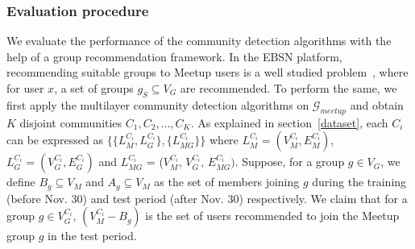 \subsubsection{Evaluation procedure}
We evaluate the performance of the community detection algorithms with the help of a group recommendation framework.
In the EBSN platform, recommending suitable groups to Meetup users is a well studied problem~\cite{group_reco2_TASP}, where for 
user $x$, a set of groups $g_S \subseteq V_G$
are recommended.
To perform the same, we first apply the multilayer community detection algorithms on $\mathcal{G}_{meetup}$ and obtain $K$ disjoint
communities $C_1, C_2,\dots,C_K$. As explained in section~\ref{dataset}, each $C_i$ can be expressed as
$\{\{L^{C_i}_M, L^{C_i}_G\},\{L^{C_i}_{MG}\}\}$ where $L^{C_i}_M = (V^{C_i}_M, E^{C_i}_M)$,
$L^{C_i}_G = (V^{C_i}_G, E^{C_i}_G)$ and $L^{C_i}_{MG}$ = ($V^{C_i}_M$, $V^{C_i}_G$, $E^{C_i}_{MG})$.
Suppose, for a group $g \in V_G$, we define ${B}_g \subseteq V_M$ and ${A}_g \subseteq V_M$ as the set of members joining $g$
during the training (before Nov. $30$) and test period (after Nov. $30$) respectively.
We claim that for a group $g \in V^{C_i}_G$, $(V^{C_i}_M-{B}_g)$ is the set of users recommended to join the Meetup group $g$ in the 
test period.

